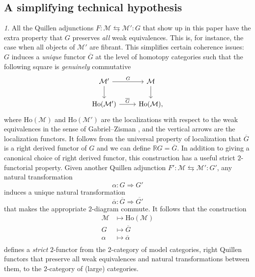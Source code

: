 \documentclass[reqno]{amsart}
\theoremstyle{plain}
\theoremstyle{definition}
\theoremstyle{remark}
\newtheorem{paragr}[subsubsection]{} %
\newcommand{\M}{\mathcal{M}}
\newcommand{\Loc}[1]{\mathrm{Ho}(#1)} %
\newcommand{\GZ}[1]{\overline{#1}} %
\newcommand{\nbd}{\nobreakdash} %
\begin{document}
\subsection{A simplifying technical hypothesis}
\begin{paragr}\label{paragr:techyp}
  All the Quillen adjunctions $F \colon \M \leftrightarrows \M' \colon G$
  that show up in this paper have the extra property that $G$
  preserves \emph{all} weak equivalences. This is, for instance, the
  case when all objects of $\M'$ are fibrant.
This simplifies certain coherence issues: $G$ induces a \emph{unique} functor $\GZ{G}$ at the level of
  homotopy categories such that the following square is \emph{genuinely}
  commutative
  \[
    \begin{tikzcd} \M' \ar[d] \ar[r,"G"] &
\M\ar[d]\\ \Loc{\M'} \ar[r,"\GZ{G}"] &
\Loc{\M},
    \end{tikzcd}
  \]
  where $\Loc{\M}$ and $\Loc{\M'}$ are the localizations with respect
  to the weak equivalences in the sense of Gabriel--Zisman \cite{gabrielzisman:calfrh}, and
  the vertical arrows are the localization functors. It follows from
  the universal property of localization that
  $\GZ{G}$ is a right derived
  functor of $G$ and we can define $\mathbb{R}G=\overline{G}$. In addition to giving a canonical choice of right derived functor, this construction
  has a useful strict $2$\nbd-functorial property. Given another
  Quillen adjunction $F' \colon \M \leftrightarrows \M' \colon G'$, 
  any natural transformation \[\alpha \colon G \Rightarrow G'\] induces
  a unique natural transformation \[\GZ{\alpha} \colon \GZ{G}
    \Rightarrow \GZ{G'}\]
  that makes the appropriate $2$\nbd-diagram commute. It follows that the
  construction
  \[
    \begin{aligned}
    \M &\longmapsto\Loc{\M}\\
    G &\longmapsto\GZ{G}\\
    \alpha &\longmapsto\GZ{\alpha}\\
  \end{aligned}
\]
defines a \emph{strict} $2$\nbd-functor from the $2$\nbd-category of
  model categories, right Quillen functors that preserve all weak
  equivalences and natural transformations between them, to the
  $2$\nbd-category of (large) categories.


\end{paragr}
\end{document}
